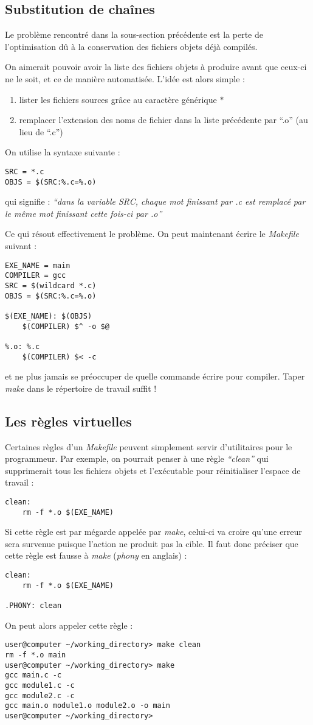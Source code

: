 \documentclass[../../../main.tex]{subfiles}
\begin{document}
\subsection{Substitution de chaînes}
Le problème rencontré dans la sous-section précédente est la perte de l'optimisation dû à la conservation des fichiers objets déjà compilés.
 
On aimerait pouvoir avoir la liste des fichiers objets à produire avant que ceux-ci ne le soit, et ce de manière automatisée. L'idée est alors simple :
\begin{enumerate}
	\item lister les fichiers sources grâce au caractère générique $*$
	\item remplacer l'extension des noms de fichier dans la liste précédente par ``.o'' (au lieu de ``.c'')
\end{enumerate}
On utilise la syntaxe suivante :
\begin{verbatim}
SRC = *.c
OBJS = $(SRC:%.c=%.o)
\end{verbatim}
qui signifie : \textit{``dans la variable SRC, chaque mot finissant par .c est remplacé par le même mot finissant cette fois-ci par .o''}
 
Ce qui résout effectivement le problème. On peut maintenant écrire le \textit{Makefile} suivant :
\begin{verbatim}
EXE_NAME = main
COMPILER = gcc
SRC = $(wildcard *.c)
OBJS = $(SRC:%.c=%.o)

$(EXE_NAME): $(OBJS)
	$(COMPILER) $^ -o $@

%.o: %.c
	$(COMPILER) $< -c
\end{verbatim}
et ne plus jamais se préoccuper de quelle commande écrire pour compiler. Taper \textit{make} dans le répertoire de travail suffit !
\subsection{Les règles virtuelles}
Certaines règles d'un \textit{Makefile} peuvent simplement servir d'utilitaires pour le programmeur. Par exemple, on pourrait penser à une règle \textit{``clean''} qui supprimerait tous les fichiers objets et l'exécutable pour réinitialiser l'espace de travail :
\begin{verbatim}
clean:
	rm -f *.o $(EXE_NAME)
\end{verbatim}
Si cette règle est par mégarde appelée par \textit{make}, celui-ci va croire qu'une erreur sera survenue puisque l'action ne produit pas la cible. Il faut donc préciser que cette règle est fausse à \textit{make} (\textit{phony} en anglais) :
\begin{verbatim}
clean:
	rm -f *.o $(EXE_NAME)

.PHONY: clean
\end{verbatim}
On peut alors appeler cette règle :
\begin{verbatim}
user@computer ~/working_directory> make clean
rm -f *.o main
user@computer ~/working_directory> make
gcc main.c -c
gcc module1.c -c
gcc module2.c -c
gcc main.o module1.o module2.o -o main
user@computer ~/working_directory>
\end{verbatim}
\end{document}
